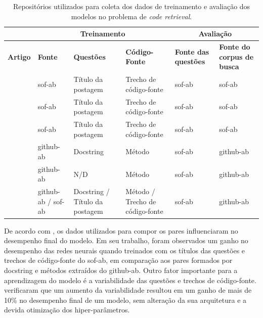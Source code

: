 \begin{table}[h]
\centering
\begin{tabular}{ p{8em} p{5em} p{5em} p{5em} p{5em} p{5em} }
\hline
 & \multicolumn{3}{c}{\textbf{Treinamento}} & \multicolumn{2}{c}{\textbf{Avaliação}} \\
\hline
\textbf{Artigo} & \textbf{Fonte} & \textbf{Questões} & \textbf{Código-Fonte} & \textbf{Fonte das questões} & \textbf{Fonte do corpus de busca}\\
\hline

\cite{Allamanis-bimodal-source-code-natural-language:2015} & \acrshort{sof-ab} & Título da postagem & Trecho de código-fonte & \acrshort{sof-ab} & \acrshort{sof-ab}\\

\cite{Chen-bi-variational-autoencoder:2018} & \acrshort{sof-ab} & Título da postagem & Trecho de código-fonte & \acrshort{sof-ab} & \acrshort{sof-ab}\\

\cite{iyer-etal-2016-summarizing} & \acrshort{sof-ab} & Título da postagem & Trecho de código-fonte & \acrshort{sof-ab} & \acrshort{sof-ab}\\

\cite{Gu-deep-code-search:2018} & \acrshort{github-ab} & Docstring & Método & \acrshort{sof-ab} & \acrshort{github-ab}\\

\cite{Sachdev-neural-code-search:2018} & \acrshort{github-ab} & N/D & Método	& \acrshort{sof-ab} & \acrshort{github-ab}\\

\cite{cambronero-deep-learning-code-search:2019} & \acrshort{github-ab} / \acrshort{sof-ab} & Docstring / Título da postagem & Método / Trecho de código-fonte & \acrshort{sof-ab} & \acrshort{github-ab}\\

 \hline
 
\end{tabular}
\caption{Repositórios utilizados para coleta dos dados de treinamento e avaliação dos modelos no problema de \textit{code retrieval}.}
\label{table:summary-source-data}
\end{table}




De acordo com \cite{cambronero-deep-learning-code-search:2019}, os dados utilizados para compor os pares influenciaram no desempenho final do modelo. Em seu trabalho, foram observados um ganho no desempenho das redes neurais quando treinados com os títulos das questões e trechos de código-fonte do \acrfull{sof-ab}, em comparação aos pares formados por \gls{docstring} e métodos extraídos do \acrfull{github-ab}. Outro fator importante para a aprendizagem do modelo é a variabilidade das questões e trechos de código-fonte. \cite{yao-2018} verificaram que um aumento da variabilidade resultou em um ganho de mais de 10\% no desempenho final de um modelo, sem alteração da sua arquitetura e a devida otimização dos hiper-parâmetros.


